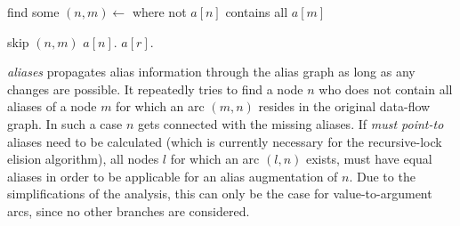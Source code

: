 \begin{algorithmic}
 
  \State {} 
\EndFor
\Repeat
  \State find some $(n, m) \gets$  where not $a[n]$ contains all $a[m]$

    \State skip $(n, m)$
  \Else
    \State $a[n]$.
        \State $a[r]$.
      \EndFor
    \EndIf
  \EndIf

\EndFunction
\end{algorithmic}
\textit{aliases} propagates alias information through the alias graph as long as any changes are possible. It repeatedly tries to find a node $n$ who does not contain all aliases of a node $m$ for which an arc $(m, n)$ resides in the original data-flow graph. In such a case $n$ gets connected with the missing aliases. If \textit{must point-to} aliases need to be calculated (which is currently necessary for the recursive-lock elision algorithm), all nodes $l$ for which an arc $(l, n)$ exists, must have equal aliases in order to be applicable for an alias augmentation of $n$. Due to the simplifications of the analysis, this can only be the case for value-to-argument arcs, since no other branches are considered. 

